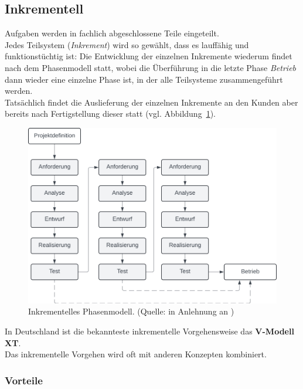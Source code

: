 
\subsection{Inkrementell}
Aufgaben werden in fachlich abgeschlossene Teile eingeteilt.\\
Jedes Teilsystem (\textit{Inkrement}) wird so gewählt, dass es lauffähig und funktionstüchtig ist: Die Entwicklung der einzelnen Inkremente wiederum findet nach dem Phasenmodell statt,
wobei die Überführung in die letzte Phase \textit{Betrieb} dann wieder eine einzelne Phase ist, in der alle Teilsysteme zusammengeführt werden.\\
Tatsächlich findet die Auslieferung der einzelnen Inkremente an den Kunden aber bereits nach Fertigstellung dieser statt (vgl. Abbildung~\ref{fig:inkrementell}).\\

\begin{figure}
    \centering
    \includegraphics[scale=0.4]{chapters/Prozessmodelle/img/inkrementell}
    \caption{Inkrementelles Phasenmodell. (Quelle: in Anlehnung an \cite[322]{AABG14n})}
    \label{fig:inkrementell}
\end{figure}

\noindent
In Deutschland ist die bekannteste inkrementelle Vorgehensweise das \textbf{V-Modell XT}.\\
Das inkrementelle Vorgehen wird oft mit anderen Konzepten kombiniert.

\subsubsection*{Vorteile}

